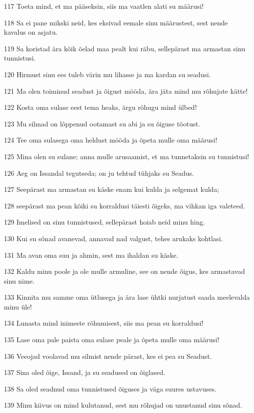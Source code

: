 \par 117 Toeta mind, et ma pääseksin, siis ma vaatlen alati su määrusi!
\par 118 Sa ei pane mikski neid, kes eksivad eemale sinu määrustest, sest nende kavalus on asjatu.
\par 119 Sa koristad ära kõik õelad maa pealt kui räbu, sellepärast ma armastan sinu tunnistusi.
\par 120 Hirmust sinu ees tuleb värin mu lihasse ja ma kardan su seadusi.
\par 121 Ma olen toiminud seadust ja õigust mööda, ära jäta mind mu rõhujate kätte!
\par 122 Kosta oma sulase eest tema heaks, ärgu rõhugu mind ülbed!
\par 123 Mu silmad on lõppenud ootamast su abi ja su õiguse tõotust.
\par 124 Tee oma sulasega oma heldust mööda ja õpeta mulle oma määrusi!
\par 125 Mina olen su sulane; anna mulle arusaamist, et ma tunnetaksin su tunnistusi!
\par 126 Aeg on Issandal tegutseda; on ju tehtud tühjaks su Seadus.
\par 127 Seepärast ma armastan su käske enam kui kulda ja selgemat kulda;
\par 128 seepärast ma pean kõiki su korraldusi täiesti õigeks, ma vihkan iga valeteed.
\par 129 Imelised on sinu tunnistused, sellepärast hoiab neid minu hing.
\par 130 Kui su sõnad avanevad, annavad nad valgust, tehes arukaks kohtlasi.
\par 131 Ma avan oma suu ja ahmin, sest ma ihaldan su käske.
\par 132 Kaldu minu poole ja ole mulle armuline, see on nende õigus, kes armastavad sinu nime.
\par 133 Kinnita mu samme oma ütlusega ja ära lase ühtki nurjatust saada meelevalda minu üle!
\par 134 Lunasta mind inimeste rõhumisest, siis ma pean su korraldusi!
\par 135 Lase oma pale paista oma sulase peale ja õpeta mulle oma määrusi!
\par 136 Veeojad voolavad mu silmist nende pärast, kes ei pea su Seadust.
\par 137 Sina oled õige, Issand, ja su seadused on õiglased.
\par 138 Sa oled seadnud oma tunnistused õiguses ja väga suures ustavuses.
\par 139 Minu kiivus on mind kulutanud, sest mu rõhujad on unustanud sinu sõnad.
